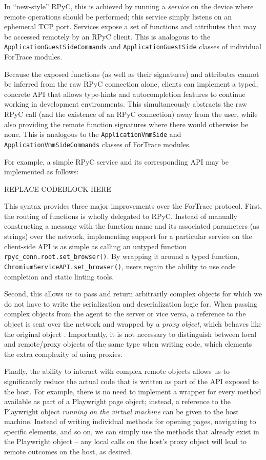 In ``new-style'' RPyC, this is achieved by running a \emph{service} on
the device where remote operations should be performed; this service
simply listens on an ephemeral TCP port. Services expose a set of
functions and attributes that may be accessed remotely by an RPyC
client. This is analogous to the \texttt{ApplicationGuestSideCommands}
and \texttt{ApplicationGuestSide} classes of individual ForTrace
modules.

Because the exposed functions (as well as their signatures) and
attributes cannot be inferred from the raw RPyC connection alone,
clients can implement a typed, concrete API that allows type-hints and
autocompletion features to continue working in development environments.
This simultaneously abstracts the raw RPyC call (and the existence of an
RPyC connection) away from the user, while also providing the remote
function signatures where there would otherwise be none. This is
analogous to the \texttt{ApplicationVmmSide} and
\texttt{ApplicationVmmSideCommands} classes of ForTrace modules.

For example, a simple RPyC service and its corresponding API may be
implemented as follows:

REPLACE CODEBLOCK HERE

This syntax provides three major improvements over the ForTrace
protocol. First, the routing of functions is wholly delegated to RPyC.
Instead of manually constructing a message with the function name and
its associated parameters (as strings) over the network, implementing
support for a particular service on the client-side API is as simple as
calling an untyped function \texttt{rpyc\_conn.root.set\_browser()}. By
wrapping it around a typed function,
\texttt{ChromiumServiceAPI.set\_browser()}, users regain the ability to
use code completion and static linting tools.

Second, this allows us to pass and return arbitrarily complex objects
for which we do not have to write the serialization and deserialization
logic for. When passing complex objects from the agent to the server or
vice versa, a reference to the object is sent over the network and
wrapped by a \emph{proxy object}, which behaves like the original object
\cite{TheoryOperationRPyC}. Importantly, it is not necessary to
distinguish between local and remote/proxy objects of the same type when
writing code, which elements the extra complexity of using proxies.

Finally, the ability to interact with complex remote objects allows us
to significantly reduce the actual code that is written as part of the
API exposed to the host. For example, there is no need to implement a
wrapper for every method available as part of a Playwright page object;
instead, a reference to the Playwright object \emph{running on the
virtual machine} can be given to the host machine. Instead of writing
individual methods for opening pages, navigating to specific elements,
and so on, we can simply use the methods that already exist in the
Playwright object -- any local calls on the host's proxy object will
lead to remote outcomes on the host, as desired.

